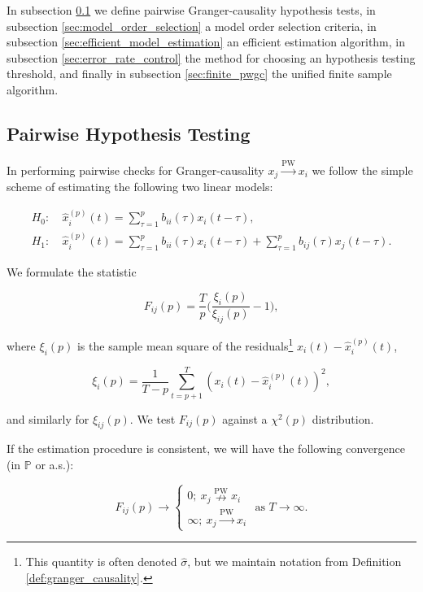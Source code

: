 \documentclass{statsoc}
\def\pwgc{\overset{\text{PW}}{\rightarrow}}  %
\def\npwgc{\overset{\text{PW}}{\nrightarrow}}  %
\def\P{\mathbb{P}}  %
\begin{document}
In subsection \ref{sec:pairwise_hypothesis_testing} we define pairwise
Granger-causality hypothesis tests, in subsection
\ref{sec:model_order_selection} a model order selection criteria, in
subsection \ref{sec:efficient_model_estimation} an efficient
estimation algorithm, in subsection \ref{sec:error_rate_control} the
method for choosing an hypothesis testing threshold, and finally in
subsection \ref{sec:finite_pwgc} the unified finite sample algorithm.

\subsection{Pairwise Hypothesis Testing}
\label{sec:pairwise_hypothesis_testing}
In performing pairwise checks for Granger-causality $x_j \pwgc x_i$ we
follow the simple scheme of estimating the following two linear models:

\begin{align}
  H_0:&\ \widehat{x}_i^{(p)}(t) = \sum_{\tau = 1}^{p} b_{ii}(\tau)x_i(t - \tau),\\
  H_1:&\ \widehat{x}_i^{(p)}(t) = \sum_{\tau = 1}^{p} b_{ii}(\tau)x_i(t - \tau) + \sum_{\tau = 1}^pb_{ij}(\tau)x_j(t - \tau).
\end{align}

We formulate the statistic 

\begin{equation}
  \label{eqn:gc_statistics}
  F_{ij}(p) = \frac{T}{p}\Big(\frac{\xi_i(p)}{\xi_{ij}(p)} - 1\Big),
\end{equation}

where $\xi_i(p)$ is the sample mean square of the
residuals\footnote{This quantity is often denoted $\widehat{\sigma}$,
  but we maintain notation from Definition
  \ref{def:granger_causality}.}  $x_i(t) - \widehat{x}^{(p)}_i(t)$,

\begin{equation*}
  \xi_i(p) = \frac{1}{T - p}\sum_{t = p + 1}^T (x_i(t) - \widehat{x}_i^{(p)}(t))^2,
\end{equation*}

and similarly for $\xi_{ij}(p)$.  We test $F_{ij}(p)$ against a
$\chi^2(p)$ distribution.

If the estimation procedure is consistent, we will have the following
convergence (in $\P$ or a.s.):

\begin{equation}
  F_{ij}(p) \rightarrow
  \left\{
    \begin{array}{ll}
      0;\ x_j \npwgc x_i\\
      \infty;\ x_j \pwgc x_i
    \end{array}
  \right. \text{ as } T \rightarrow \infty.  %
\end{equation}
\end{document}
